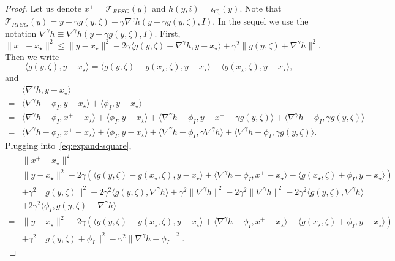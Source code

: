 \documentclass{article}
\newcommand{\1}{\mathbbm 1}
\newcommand{\cT}{{{\mathcal T}}}
\newcommand{\ps}[1]{\langle #1 \rangle}
\theoremstyle{definition}
\begin{document}
\begin{proof}
Let us denote $x^+ = \cT_{RPSG}(y)$ and $h(y,i) = \iota_{C_i}(y)$. Note that $\cT_{RPSG}(y) = y - \gamma g(y,\zeta) - \gamma \nabla ^\gamma h(y - \gamma g(y,\zeta),I)$. In the sequel we use the notation $\nabla ^\gamma h \equiv \nabla ^\gamma h(y - \gamma g(y,\zeta),I)$. First,
\begin{equation}
\label{eq:expand-square}
    \|x^+ - x_\star\|^2 \leq \|y - x_\star\|^2 -2\gamma\ps{g(y,\zeta) + \nabla ^\gamma h, y - x_\star} + \gamma^2\|g(y,\zeta) + \nabla ^\gamma h\|^2.
\end{equation}
Then we write
\begin{equation*}
    \ps{g(y,\zeta),y-x_\star} = \ps{g(y,\zeta) - g(x_\star,\zeta),y-x_\star} + \ps{g(x_\star,\zeta),y-x_\star},
\end{equation*}
and
\begin{align*}
    &\ps{\nabla ^\gamma h,y-x_\star} \\=& \ps{\nabla ^\gamma h - \phi_I,y-x_\star} + \ps{\phi_I,y-x_\star}\\
    =&\ps{\nabla ^\gamma h - \phi_I,x^+-x_\star} + \ps{\phi_I,y-x_\star} + \ps{\nabla ^\gamma h - \phi_I,y - x^+- \gamma g(y,\zeta)} + \ps{\nabla ^\gamma h - \phi_I, \gamma g(y,\zeta)}\\
    =&\ps{\nabla ^\gamma h - \phi_I,x^+-x_\star} + \ps{\phi_I,y-x_\star} + \ps{\nabla ^\gamma h - \phi_I,\gamma \nabla ^\gamma h} + \ps{\nabla ^\gamma h - \phi_I, \gamma g(y,\zeta)}.
\end{align*}
Plugging into~\eqref{eq:expand-square},
\begin{align*}
\label{eq:expand-square}
    &\|x^+ - x_\star\|^2 \\ 
    =& \|y - x_\star\|^2 -2\gamma \left(\ps{g(y,\zeta) - g(x_\star,\zeta),y-x_\star} + \ps{\nabla ^\gamma h - \phi_I,x^+-x_\star} - \ps{g(x_\star,\zeta)+ \phi_I,y-x_\star}\right)\\
    &+ \gamma^2\|g(y,\zeta)\|^2 + 2\gamma^2\ps{g(y,\zeta),\nabla ^\gamma h} + \gamma^2\|\nabla ^\gamma h\|^2 - 2\gamma^2\|\nabla ^\gamma h\|^2 - 2\gamma^2\ps{g(y,\zeta),\nabla ^\gamma h}\\
    &+ 2\gamma^2\ps{\phi_I,g(y,\zeta)+\nabla ^\gamma h}\\
    =& \|y - x_\star\|^2 -2\gamma \left(\ps{g(y,\zeta) - g(x_\star,\zeta),y-x_\star} + \ps{\nabla ^\gamma h - \phi_I,x^+-x_\star} - \ps{g(x_\star,\zeta)+ \phi_I,y-x_\star}\right)\\
    &+ \gamma^2\|g(y,\zeta) + \phi_I\|^2 - \gamma^2\|\nabla ^\gamma h - \phi_I\|^2.
\end{align*}

\end{proof}
\end{document}
